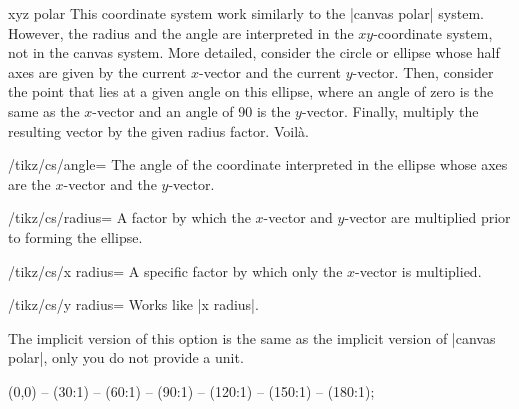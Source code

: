 \begin{coordinatesystem}{xyz polar}
    This coordinate system work similarly to the |canvas polar| system.
    However, the radius and the angle are interpreted in the $xy$-coordinate
    system, not in the canvas system. More detailed, consider the circle or
    ellipse whose half axes are given by the current $x$-vector and the current
    $y$-vector. Then, consider the point that lies at a given angle on this
    ellipse, where an angle of zero is the same as the $x$-vector and an angle
    of 90 is the $y$-vector. Finally, multiply the resulting vector by the
    given radius factor. Voil\`a.
    \begin{key}{/tikz/cs/angle=}
        The angle of the coordinate interpreted in the ellipse whose axes are
        the $x$-vector and the $y$-vector.
    \end{key}
    \begin{key}{/tikz/cs/radius=}
        A factor by which the $x$-vector and $y$-vector are multiplied prior to
        forming the ellipse.
    \end{key}
    \begin{key}{/tikz/cs/x radius=}
        A specific factor by which only the $x$-vector is multiplied.
    \end{key}
    \begin{key}{/tikz/cs/y radius=}
        Works like |x radius|.
    \end{key}
\begin{codeexample}[]
\end{codeexample}

    The implicit version of this option is the same as the implicit version of
    |canvas polar|, only you do not provide a unit.

\begin{codeexample}[]
\tikz[x={(0cm,1cm)},y={(-1cm,0cm)}]
  \draw  (0,0) -- (30:1) -- (60:1) -- (90:1)
             -- (120:1) -- (150:1) -- (180:1);
\end{codeexample}
\end{coordinatesystem}

